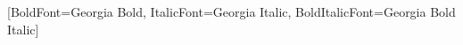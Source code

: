 
\usepackage{fontspec}
\setmainfont{Georgia}[BoldFont={Georgia Bold}, ItalicFont={Georgia Italic}, BoldItalicFont={Georgia Bold Italic}]
\usepackage{newunicodechar}
\newfontfamily{}
